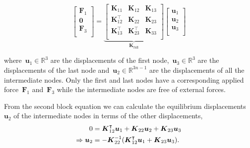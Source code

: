 \begin{equation}
\begin{bmatrix}
\boldsymbol{F}_{1} \\
\boldsymbol{0} \\
\boldsymbol{F}_{3} \\
\end{bmatrix}
=
\underbrace{
\begin{bmatrix}
          \boldsymbol{K}_{11} &           \boldsymbol{K}_{12} & \boldsymbol{K}_{13} \\
\boldsymbol{K}_{12}^\intercal &           \boldsymbol{K}_{22} & \boldsymbol{K}_{23} \\
\boldsymbol{K}_{13}^\intercal & \boldsymbol{K}_{23}^\intercal & \boldsymbol{K}_{33} \\
\end{bmatrix}
}_{\boldsymbol{K}_{\mathrm{full}}}
\begin{bmatrix}
\boldsymbol{u}_{1} \\
\boldsymbol{u}_{2} \\
\boldsymbol{u}_{3} \\
\end{bmatrix}
\end{equation}

where~$\boldsymbol{u}_1 \in \mathbb{R}^3$ are the displacements of the first node,~$\boldsymbol{u}_3 \in \mathbb{R}^3$ are the displacements of the last node and~$\boldsymbol{u}_2 \in \mathbb{R}^{3n-1}$ are the displacements of all the intermediate nodes.
Only the first and last nodes have a corresponding applied force~$\boldsymbol{F}_{1}$ and~$\boldsymbol{F}_{3}$ while the intermediate nodes are free of external forces.

From the second block equation we can calculate the equilibrium displacements~$\boldsymbol{u}_{2}$ of the intermediate nodes in terms of the other displacements,
%
\begin{align}
0 &= \boldsymbol{K}_{12}^\intercal \boldsymbol{u}_1 + \boldsymbol{K}_{22}\boldsymbol{u}_2 + \boldsymbol{K}_{23}\boldsymbol{u}_3 \notag \\
\Rightarrow \boldsymbol{u}_2 &= -\boldsymbol{K}_{22}^{-1}(\boldsymbol{K}_{12}^\intercal \boldsymbol{u}_1 + \boldsymbol{K}_{23}\boldsymbol{u}_3).
\end{align}

